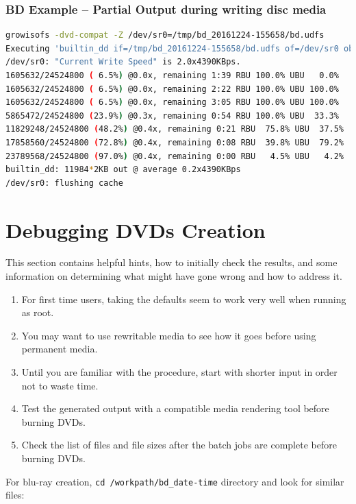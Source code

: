 \subsubsection*{BD Example – Partial Output during writing disc media}
\label{ssub:bd_example_partial_output_writing}

\begin{lstlisting}[language=bash]
growisofs -dvd-compat -Z /dev/sr0=/tmp/bd_20161224-155658/bd.udfs
Executing 'builtin_dd if=/tmp/bd_20161224-155658/bd.udfs of=/dev/sr0 obs=32k seek=0'
/dev/sr0: "Current Write Speed" is 2.0x4390KBps.
1605632/24524800 ( 6.5%) @0.0x, remaining 1:39 RBU 100.0% UBU   0.0%
1605632/24524800 ( 6.5%) @0.0x, remaining 2:22 RBU 100.0% UBU 100.0%
1605632/24524800 ( 6.5%) @0.0x, remaining 3:05 RBU 100.0% UBU 100.0%
5865472/24524800 (23.9%) @0.3x, remaining 0:54 RBU 100.0% UBU  33.3%
11829248/24524800 (48.2%) @0.4x, remaining 0:21 RBU  75.8% UBU  37.5%
17858560/24524800 (72.8%) @0.4x, remaining 0:08 RBU  39.8% UBU  79.2%
23789568/24524800 (97.0%) @0.4x, remaining 0:00 RBU   4.5% UBU   4.2%
builtin_dd: 11984*2KB out @ average 0.2x4390KBps
/dev/sr0: flushing cache
\end{lstlisting}

\section{Debugging DVDs Creation}%
\label{sec:debugging_dvd_creation}

This section contains helpful hints, how to initially check the results, and some information on determining what might have gone wrong and how to address it.

\begin{enumerate}
    \item For first time users, taking the defaults seem to work very well when running as root.
    \item You may want to use rewritable media to see how it goes before using permanent media.
    \item Until you are familiar with the procedure, start with shorter input in order not to waste time.
    \item Test the generated output with a compatible media rendering tool before burning DVDs.
    \item Check the list of files and file sizes after the batch jobs are complete before burning DVDs.
\end{enumerate}

For blu-ray creation, \texttt{cd /workpath/bd\_date-time} directory and look for similar files:

